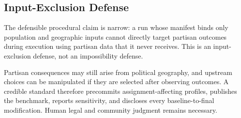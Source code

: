 \subsection{Input-Exclusion Defense}

The defensible procedural claim is narrow: a run whose manifest binds only
population and geographic inputs cannot directly target partisan outcomes
during execution using partisan data that it never receives. This is an
input-exclusion defense, not an impossibility defense.

Partisan consequences may still arise from political geography, and upstream
choices can be manipulated if they are selected after observing outcomes. A
credible standard therefore precommits assignment-affecting profiles, publishes
the benchmark, reports sensitivity, and discloses every baseline-to-final
modification. Human legal and community judgment remains necessary.
